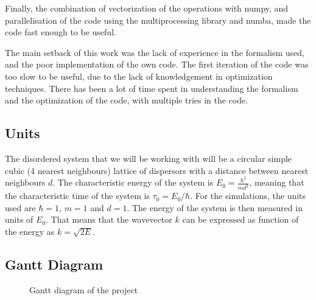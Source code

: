 Finally, the combination of vectorization of the operations with numpy, and parallelisation of the code using the multiprocessing library and numba, made the code fast enough to be useful.

The main setback of this work was the lack of experience in the formalism used, and the poor implementation of the own code. The first iteration of the code was too slow to be useful, due to the lack of knowledgement in optimization techniques. There has been a lot of time spent in understanding the formalism and the optimization of the code, with multiple tries in the code. 

\subsection{Units}

The disordered system that we will be working with will be a circular simple cubic (4 nearest neighbours) lattice of dispersors with a distance between nearest neighbours $d$. The characteristic energy of the system is $E_0 = \frac{\hbar^2}{md^2}$, meaning that the characteristic time of the system is $\tau_0 = E_0/\hbar$. For the simulations, the units used are $\hbar=1$, $m=1$ and $d=1$. The energy of the system is then measured in units of $E_0$. That means that the wavevector $k$ can be expressed as function of the energy as $k = \sqrt{2E}$.

\subsection{Gantt Diagram}
\label{ssec:gantt}
\begin{figure}[H]
    \centering
    
    \caption[Project's Gantt diagram]{\footnotesize{Gantt diagram of the project}}
    \label{fig:gantt}
\end{figure}